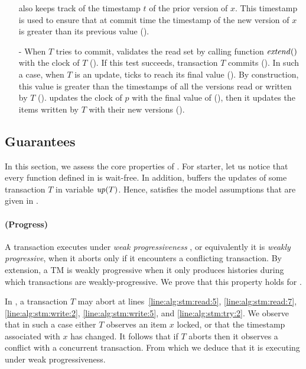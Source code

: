 \begin{itemize}
   also keeps track of the timestamp $t$ of the prior version of $x$.
  This timestamp is used to ensure that at commit time the timestamp of the new version of $x$ is greater than its previous value ().
\item[-] %
  When $T$ tries to commit,  validates the read set by calling function $\stmExtend{}$ with the clock of $T$ ().
  If this test succeeds, transaction $T$ commits ().
  In such a case, when $T$ is an update,  ticks to reach its final value ().
  By construction, this value is greater than the timestamps of all the versions read or written by $T$ ().
   updates the clock of $p$ with the final value of  (), then it updates the items written by $T$ with their new versions ().
\end{itemize}

\subsection{Guarantees}

In this section, we assess the core properties of .
%
For starter, let us notice that every function defined in  is wait-free.
In addition,  buffers the updates of some transaction $T$ in variable $\updateSetOf{T}$.
Hence,  satisfies the model assumptions that are given in .

\paragraph{(Progress)}
A transaction executes under \emph{weak progressiveness} \cite{Guerraoui:2009}, or equivalently it is \emph{weakly progressive}, when it aborts only if it encounters a conflicting transaction.
By extension, a TM is weakly progressive when it only produces histories during which transactions are weakly-progressive.
We prove that this property holds for .

In , a transaction $T$ may abort at lines~\ref{line:alg:stm:read:5}, \ref{line:alg:stm:read:7}, \ref{line:alg:stm:write:2}, \ref{line:alg:stm:write:5}, and \ref{line:alg:stm:try:2}.
We observe that in such a case either $T$ observes an item $x$ locked, or that the timestamp associated with $x$ has changed.
It follows that if $T$ aborts then it observes a conflict with a concurrent transaction.
From which we deduce that it is executing under weak progressiveness.

